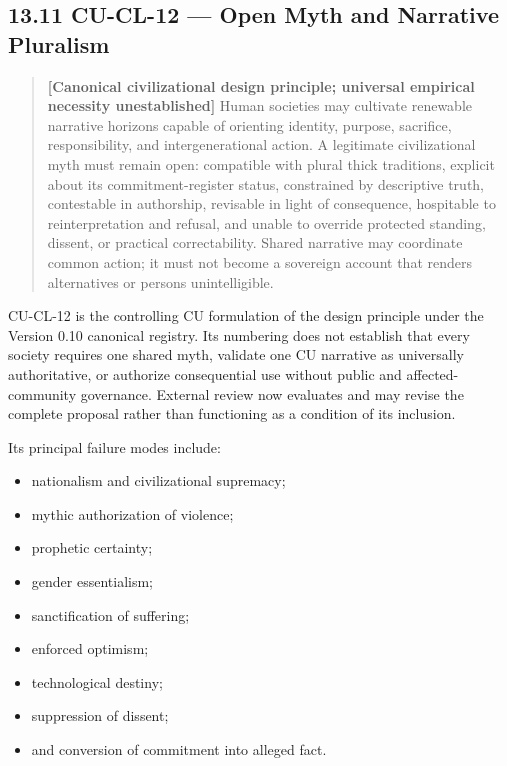 \documentclass[
  11pt,
]{article}
\providecommand{\tightlist}{%
  \setlength{\itemsep}{0pt}\setlength{\parskip}{0pt}}
\begin{document}
\subsection{13.11 CU-CL-12 --- Open Myth and Narrative
Pluralism}\label{cu-cl-12-open-myth-and-narrative-pluralism}

\begin{quote}
\textbf{{[}Canonical civilizational design principle; universal
empirical necessity unestablished{]}} Human societies may cultivate
renewable narrative horizons capable of orienting identity, purpose,
sacrifice, responsibility, and intergenerational action. A legitimate
civilizational myth must remain open: compatible with plural thick
traditions, explicit about its commitment-register status, constrained
by descriptive truth, contestable in authorship, revisable in light of
consequence, hospitable to reinterpretation and refusal, and unable to
override protected standing, dissent, or practical correctability.
Shared narrative may coordinate common action; it must not become a
sovereign account that renders alternatives or persons unintelligible.
\end{quote}

CU-CL-12 is the controlling CU formulation of the design principle under
the Version 0.10 canonical registry. Its numbering does not establish
that every society requires one shared myth, validate one CU narrative
as universally authoritative, or authorize consequential use without
public and affected-community governance. External review now evaluates
and may revise the complete proposal rather than functioning as a
condition of its inclusion.

Its principal failure modes include:

\begin{itemize}
\tightlist
\item
  nationalism and civilizational supremacy;
\item
  mythic authorization of violence;
\item
  prophetic certainty;
\item
  gender essentialism;
\item
  sanctification of suffering;
\item
  enforced optimism;
\item
  technological destiny;
\item
  suppression of dissent;
\item
  and conversion of commitment into alleged fact.
\end{itemize}
\end{document}
